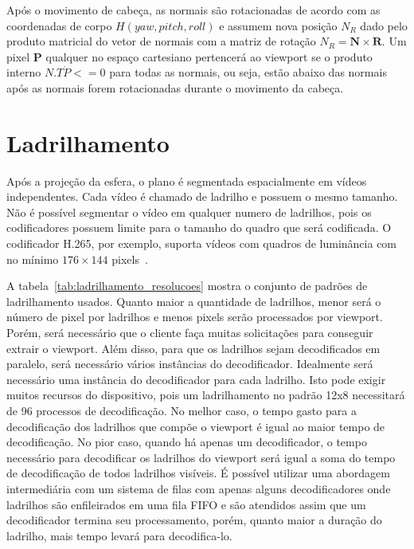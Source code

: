 Após o movimento de cabeça, as normais são rotacionadas de acordo com as coordenadas de corpo $H(yaw, pitch, roll)$ e assumem nova posição $ N_R $ dado pelo produto matricial do vetor de normais com a matriz de rotação $ N_R = \textbf{N} \times \textbf{R}$. Um pixel $ \textbf{P}$ qualquer no espaço cartesiano pertencerá ao viewport se o produto interno $ N.T \dot P <=0 $ para todas as normais, ou seja, estão abaixo das normais após as normais forem rotacionadas durante o movimento da cabeça.


\section{Ladrilhamento}

Após a projeção da esfera, o plano é segmentada espacialmente em vídeos independentes. Cada vídeo é chamado de ladrilho e possuem o mesmo tamanho. Não é possível segmentar o vídeo em qualquer numero de ladrilhos, pois os codificadores possuem limite para o tamanho do quadro que será codificada. O codificador H.265, por exemplo, suporta vídeos com quadros de luminância com no mínimo $176\times144$ pixels~\cite{Sullivan2012a}.

A tabela~\ref{tab:ladrilhamento_resolucoes} mostra o conjunto de padrões de ladrilhamento usados. Quanto maior a quantidade de ladrilhos, menor será o número de pixel por ladrilhos e menos pixels serão processados por viewport. Porém, será necessário que o cliente faça muitas solicitações para conseguir extrair o viewport. Além disso, para que os ladrilhos sejam decodificados em paralelo, será necessário vários instâncias do decodificador. Idealmente será necessário uma instância do decodificador para cada ladrilho. Isto pode exigir muitos recursos do dispositivo, pois um ladrilhamento no padrão 12x8 necessitará de 96 processos de decodificação. No melhor caso, o tempo gasto para a decodificação dos ladrilhos que compõe o viewport é igual ao maior tempo de decodificação. No pior caso, quando há apenas um decodificador, o tempo necessário para decodificar os ladrilhos do viewport será igual a soma do tempo de decodificação de todos ladrilhos visíveis. É possível utilizar uma abordagem intermediária com um sistema de filas com apenas alguns decodificadores onde ladrilhos são enfileirados em uma fila FIFO e são atendidos assim que um decodificador termina seu processamento, porém, quanto maior a duração do ladrilho, mais tempo levará para decodifica-lo.

